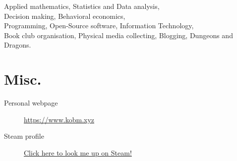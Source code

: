 \documentclass[a4paper,10pt]{article} %
\begin{document}
Applied mathematics, Statistics and Data analysis,\\
Decision making, Behavioral economics,\\
Programming, Open-Source software, Information Technology,\\
Book club organisation, Physical media collecting, Blogging, Dungeons and Dragons.

\section{Misc.}

\begin{description}
    \item[Personal webpage] \href{https://www.kobm.xyz}{https://www.kobm.xyz}
    \item[Steam profile] \href{https://steamcommunity.com/id/clydeBM/}{Click here to look me up on Steam!}
\end{description}

\end{document}
